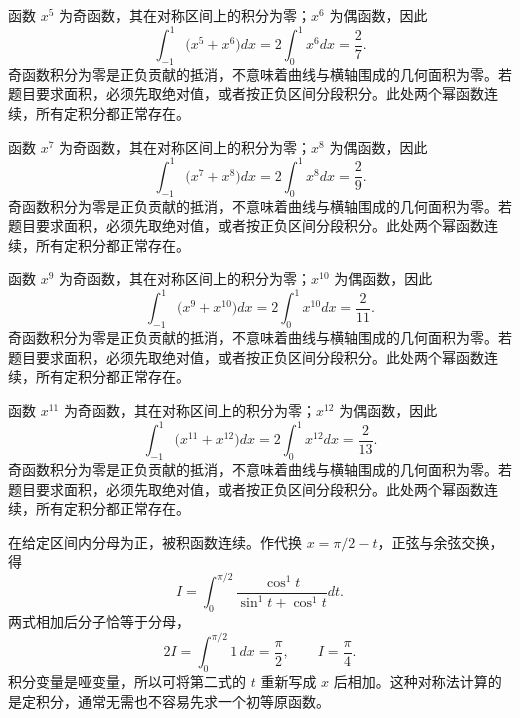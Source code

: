 \documentclass[12pt,fontset=fandol]{ctexart}
\begin{document}
\begin{solve}\label{ans:c17q17}
函数 $x^{5}$ 为奇函数，其在对称区间上的积分为零；$x^{6}$ 为偶函数，因此
\[
\int_{-1}^1\bigl(x^{5}+x^{6}\bigr)dx=2\int_0^1x^{6}dx=\frac{2}{7}.
\]
奇函数积分为零是正负贡献的抵消，不意味着曲线与横轴围成的几何面积为零。若题目要求面积，必须先取绝对值，或者按正负区间分段积分。此处两个幂函数连续，所有定积分都正常存在。
\end{solve}

\begin{solve}\label{ans:c17q18}
函数 $x^{7}$ 为奇函数，其在对称区间上的积分为零；$x^{8}$ 为偶函数，因此
\[
\int_{-1}^1\bigl(x^{7}+x^{8}\bigr)dx=2\int_0^1x^{8}dx=\frac{2}{9}.
\]
奇函数积分为零是正负贡献的抵消，不意味着曲线与横轴围成的几何面积为零。若题目要求面积，必须先取绝对值，或者按正负区间分段积分。此处两个幂函数连续，所有定积分都正常存在。
\end{solve}

\begin{solve}\label{ans:c17q19}
函数 $x^{9}$ 为奇函数，其在对称区间上的积分为零；$x^{10}$ 为偶函数，因此
\[
\int_{-1}^1\bigl(x^{9}+x^{10}\bigr)dx=2\int_0^1x^{10}dx=\frac{2}{11}.
\]
奇函数积分为零是正负贡献的抵消，不意味着曲线与横轴围成的几何面积为零。若题目要求面积，必须先取绝对值，或者按正负区间分段积分。此处两个幂函数连续，所有定积分都正常存在。
\end{solve}

\begin{solve}\label{ans:c17q20}
函数 $x^{11}$ 为奇函数，其在对称区间上的积分为零；$x^{12}$ 为偶函数，因此
\[
\int_{-1}^1\bigl(x^{11}+x^{12}\bigr)dx=2\int_0^1x^{12}dx=\frac{2}{13}.
\]
奇函数积分为零是正负贡献的抵消，不意味着曲线与横轴围成的几何面积为零。若题目要求面积，必须先取绝对值，或者按正负区间分段积分。此处两个幂函数连续，所有定积分都正常存在。
\end{solve}

\begin{solve}\label{ans:c17q21}
在给定区间内分母为正，被积函数连续。作代换 $x=\pi/2-t$，正弦与余弦交换，得
\[
I=\int_0^{\pi/2}\frac{\cos^{1}t}{\sin^{1}t+\cos^{1}t}dt.
\]
两式相加后分子恰等于分母，
\[
2I=\int_0^{\pi/2}1\,dx=\frac\pi2,\qquad I=\frac\pi4.
\]
积分变量是哑变量，所以可将第二式的 $t$ 重新写成 $x$ 后相加。这种对称法计算的是定积分，通常无需也不容易先求一个初等原函数。
\end{solve}
\end{document}
